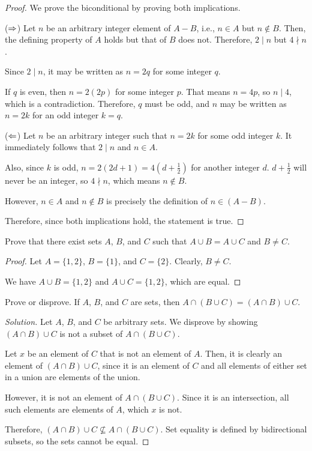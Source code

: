 \documentclass{agony}
\begin{document}
\begin{proof}
  We prove the biconditional by proving both implications.

  ($\Rightarrow$) Let $n$ be an arbitrary integer element of $A-B$, i.e., $n\in A$ but $n\not\in B$.
  Then, the defining property of $A$ holds but that of $B$ does not.
  Therefore, $2 \mid n$ but $4 \nmid n$.

  Since $2 \mid n$, it may be written as $n=2q$ for some integer $q$.

  If $q$ is even, then $n=2(2p)$ for some integer $p$.
  That means $n=4p$, so $n \mid 4$, which is a contradiction.
  Therefore, $q$ must be odd, and $n$ may be written as $n=2k$ for an odd integer $k=q$.

  ($\Leftarrow$) Let $n$ be an arbitrary integer such that $n=2k$ for some odd integer $k$.
  It immediately follows that $2 \mid n$ and $n \in A$.

  Also, since $k$ is odd, $n=2(2d+1)=4\left(d+\frac12\right)$ for another integer $d$.
  $d+\frac12$ will never be an integer, so $4 \nmid n$, which means $n \not\in B$.

  However, $n \in A$ and $n \not\in B$ is precisely the definition of $n \in (A-B)$.

  Therefore, since both implications hold, the statement is true.
\end{proof}


\question Prove that there exist sets $A$, $B$, and $C$ such that $A \cup B=A \cup C$ and $B \neq C$.

\begin{proof}
  Let $A=\{1,2\}$, $B=\{1\}$, and $C=\{2\}$.
  Clearly, $B \neq C$.

  We have $A \cup B = \{1,2\}$ and $A \cup C = \{1,2\}$, which are equal.
\end{proof}


\question Prove or disprove.
If $A$, $B$, and $C$ are sets, then $A \cap (B \cup C) = (A \cap B) \cup C$.

\begin{proof}[Solution]
  Let $A$, $B$, and $C$ be arbitrary sets.
  We disprove by showing $(A \cap B) \cup C$ is not a subset of $A \cap (B \cup C)$.

  Let $x$ be an element of $C$ that is not an element of $A$.
  Then, it is clearly an element of $(A \cap B) \cup C$, since it is an element of $C$ and all elements of either set in a union are elements of the union.

  However, it is not an element of $A \cap (B \cup C)$.
  Since it is an intersection, all such elements are elements of $A$, which $x$ is not.

  Therefore, $(A \cap B) \cup C \not\subseteq A \cap (B \cup C)$.
  Set equality is defined by bidirectional subsets, so the sets cannot be equal.
\end{proof}
\end{document}
